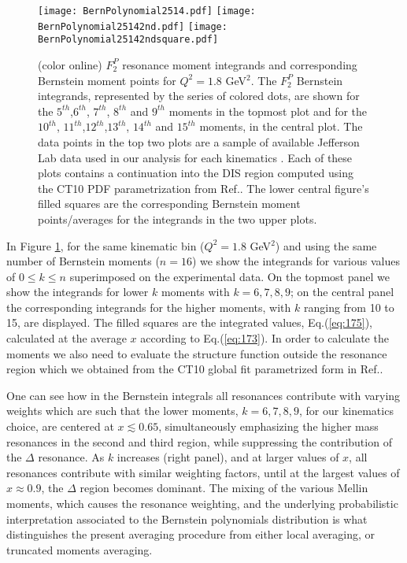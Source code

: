 \documentclass[
twocolumn,
aps,prd,
nofootinbib,
superscriptaddress,
showpacs,ligh
tightenlines, 
]{revtex4}
\begin{document}
\begin{figure}
\texttt{[image: BernPolynomial2514.pdf]}
\texttt{[image: BernPolynomial25142nd.pdf]}
\texttt{[image: BernPolynomial25142ndsquare.pdf]}
\caption{(color online) $F_{2}^{P}$ resonance moment integrands and corresponding Bernstein moment points for $Q^{2} = 1.8$ GeV$^{2}$.  The $F_{2}^{P}$ Bernstein integrands, represented by the series of colored dots, are shown for the $5^{th}$,$6^{th}$, $7^{th}$, $8^{th}$ and $9^{th}$ moments in the topmost plot and for the $10^{th}$, $11^{th}$,$12^{th}$,$13^{th}$, $14^{th}$ and $15^{th}$ moments, in the central plot. The data points in the top two plots are a sample of available Jefferson Lab data used in our analysis for each kinematics \cite{hallc}. Each of these plots contains a continuation into the DIS region computed using the CT10 PDF parametrization from Ref.\cite{Lai:2010vv}.  The lower central figure's filled squares are the corresponding Bernstein moment points/averages for the integrands in the two upper plots. }
\label{fig:BernPolynomial2514}
\end{figure}
In Figure \ref{fig:BernPolynomial2514}, for the same kinematic bin ($Q^2= 1.8$ GeV$^2$) and using the same number of Bernstein moments ($n=16$) we show the integrands for various values of $0\leq k \leq n$ superimposed on the experimental data.  On the topmost panel we show the integrands for lower $k$ moments with $k=6,7,8,9$; on the central panel the corresponding integrands for the higher moments, with $k$ ranging from 10 to 15, are displayed. The filled squares are the integrated values, Eq.(\ref{eq:175}), calculated at the average $x$ according to Eq.(\ref{eq:173}). In order to calculate the moments we also need to evaluate the structure function outside the resonance region which we obtained from the CT10 global fit parametrized form in Ref.\cite{Lai:2010vv}. 

One can see how in the Bernstein integrals all resonances contribute with varying weights which are such that the lower moments, $k=6,7,8,9$, for our kinematics choice, are centered at $x \lesssim 0.65$, simultaneously emphasizing the higher mass resonances in the second and third region, while suppressing the contribution of the $\Delta$ resonance. As $k$ increases (right panel), and at larger values of $x$, all resonances contribute with similar weighting factors, until at the largest values of $x \approx 0.9$, the $\Delta$ region becomes dominant.     
The mixing of the various Mellin moments, which causes the resonance weighting, and the underlying probabilistic interpretation associated to the Bernstein polynomials distribution is what distinguishes the present averaging procedure from either local averaging, or truncated moments averaging. 
\end{document}
